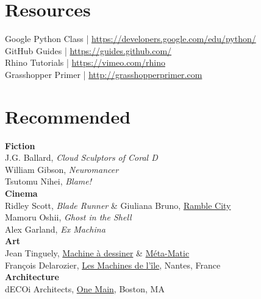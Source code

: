 \documentclass[11pt,article,oneside]{memoir}
\begin{document}
\section{Resources}
Google Python Class | \url{https://developers.google.com/edu/python/}\\
GitHub Guides | \url{https://guides.github.com/}\\
Rhino Tutorials | \url{https://vimeo.com/rhino}\\
Grasshopper Primer | \url{http://grasshopperprimer.com}\\

\section{Recommended}

\noindent \textbf{Fiction}\\
J.G. Ballard, \emph{Cloud Sculptors of Coral D}\\
William Gibson, \emph{Neuromancer}\\
Tsutomu Nihei, \emph{Blame!}\\

\noindent \textbf{Cinema}\\
Ridley Scott, \emph{Blade Runner}
\& Giuliana Bruno, \href{www.jstor.org/stable/778330}{Ramble City}\\
Mamoru Oshii, \emph{Ghost in the Shell}\\
Alex Garland, \emph{Ex Machina}\\

\noindent \textbf{Art}\\
Jean Tinguely, \href{https://www.tinguely.ch/en/sammlung/sammlung.html}{Machine \`{a} dessiner}
\& \href{https://www.tinguely.ch/en/sammlung/sammlung.html}{M\'{e}ta-Matic}\\
François Delarozier, \href{https://www.lesmachines-nantes.fr/en/}{Les Machines de l’\^{i}le}, Nantes, France\\

\noindent \textbf{Architecture}\\
dECOi Architects, \href{http://www.decoi-architects.org/2011/10/onemain/}{One Main}, Boston, MA\\

\clearpage

\end{document}
